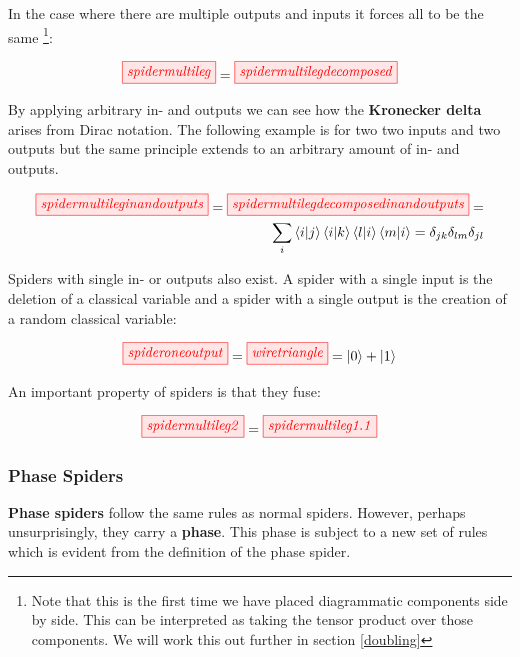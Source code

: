 \documentclass[]{article}
\begin{document}
In the case where there are multiple outputs and inputs it forces all to be the same \footnote{Note that this is the first time we have placed diagrammatic components side by side. This can be interpreted as taking the tensor product over those components. We will work this out further in section \ref{doubling}}:

\begin{equation}
\label{equation:spidermultilegdecomposed}
\tikzfig{spidermultileg} = \tikzfig{spidermultilegdecomposed}
\end{equation}

By applying arbitrary in- and outputs we can see how the \textbf{Kronecker delta} arises from Dirac notation. The following example is for two two inputs and two outputs but the same principle extends to an arbitrary amount of in- and outputs.

\begin{equation}
\begin{split}
\tikzfig{spidermultileginandoutputs} = \tikzfig{spidermultilegdecomposedinandoutputs} = \\ \sum_{i} \bra{i}\ket{j}\bra{i}\ket{k}\bra{l}\ket{i}\bra{m}\ket{i} = \delta_{jk} \delta_{lm}  \delta_{jl}
\end{split}
\end{equation}

Spiders with single in- or outputs also exist. A spider with a single input is the deletion of a classical variable and a spider with a single output is the creation of a random classical variable:

\begin{equation}
\tikzfig{spideroneoutput} = \tikzfig{wiretriangle} = \ket{0} + \ket{1}
\end{equation}

An important property of spiders is that they fuse:

\begin{equation}
\label{equation:spiderfusion}
	\tikzfig{spidermultileg2} = \tikzfig{spidermultileg1.1}
\end{equation}

\subsubsection{Phase Spiders}
\label{phasespiders}

\textbf{Phase spiders} follow the same rules as normal spiders. However, perhaps unsurprisingly, they carry a \textbf{phase}. This phase is subject to a new set of rules which is evident from the definition of the phase spider. 
\end{document}
